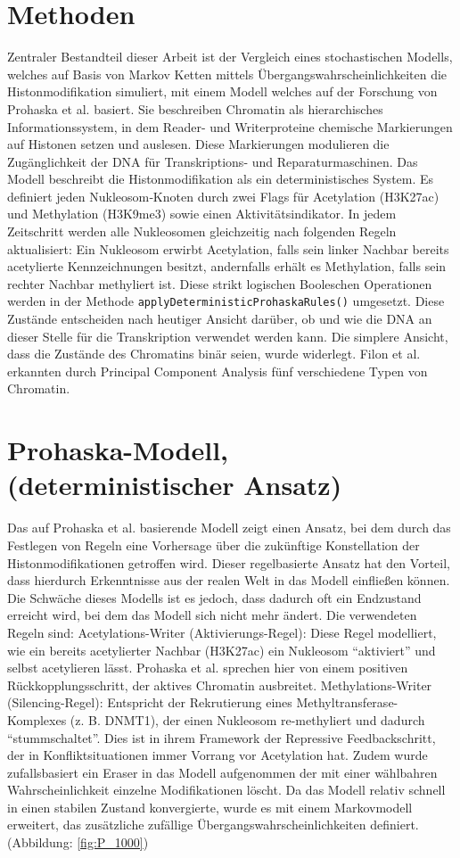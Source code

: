 \documentclass{SeminarV2}
\begin{document}
\section{Methoden}
Zentraler Bestandteil dieser Arbeit ist der Vergleich eines stochastischen Modells, welches auf Basis von Markov Ketten mittels \"{U}bergangswahrscheinlichkeiten die Histonmodifikation simuliert, mit einem Modell welches auf der Forschung von
Prohaska et al. basiert.
Sie beschreiben Chromatin als hierarchisches Informationssystem, in dem Reader- und Writerproteine chemische Markierungen auf Histonen setzen und auslesen. 
Diese Markierungen modulieren die Zugänglichkeit der DNA für Transkriptions- und Reparaturmaschinen.
Das Modell beschreibt die Histonmodifikation als ein deterministisches System.
Es definiert jeden Nukleosom‑Knoten durch zwei Flags für Acetylation (H3K27ac) und Methylation (H3K9me3) sowie einen Aktivitätsindikator. In jedem Zeitschritt werden alle Nukleosomen gleichzeitig nach folgenden Regeln aktualisiert: 
Ein Nukleosom erwirbt Acetylation, falls sein linker Nachbar bereits acetylierte Kennzeichnungen besitzt, andernfalls erhält es Methylation, falls sein rechter Nachbar methy­liert ist. Diese strikt logischen Booleschen Operationen werden in der Methode \texttt{applyDeterministicProhaskaRules()} umgesetzt.
Diese Zustände entscheiden nach heutiger Ansicht darüber, ob und wie die DNA an dieser Stelle für die Transkription verwendet werden kann.
Die simplere Ansicht, dass die Zustände des Chromatins binär seien, wurde widerlegt. Filon et al. erkannten durch Principal Component Analysis fünf verschiedene 
Typen von Chromatin. \cite{filon-2010}

\section{Prohaska-Modell, (deterministischer Ansatz)}
Das auf Prohaska et al. basierende Modell zeigt einen Ansatz, bei dem durch das Festlegen
von Regeln eine Vorhersage über die zukünftige Konstellation der Histonmodifikationen getroffen wird.
Dieser regelbasierte Ansatz hat den Vorteil, dass hierdurch Erkenntnisse aus der realen Welt in das Modell einfließen können.
Die Schwäche dieses Modells ist es jedoch, dass dadurch oft ein Endzustand erreicht wird, bei dem das Modell sich nicht mehr ändert.
Die verwendeten Regeln sind:
Acetylations-Writer (Aktivierungs-Regel):
Diese Regel modelliert, wie ein bereits acetylierter Nachbar (H3K27ac) ein Nukleosom “aktiviert” und selbst acetylieren lässt. Prohaska et al. sprechen hier von einem positiven Rückkopplungsschritt, der aktives Chromatin ausbreitet.
Methylations-Writer (Silencing-Regel):
Entspricht der Rekrutierung eines Methyltransferase-Komplexes (z. B. DNMT1), der einen Nukleosom re-methyliert und dadurch “stummschaltet”. Dies ist in ihrem Framework der Repressive Feedbackschritt, der in Konfliktsituationen immer Vorrang vor Acetylation hat.
Zudem wurde zufallsbasiert ein Eraser in das Modell aufgenommen der mit einer wählbahren Wahrscheinlichkeit einzelne Modifikationen löscht.
Da das Modell relativ schnell in einen stabilen Zustand konvergierte, wurde es mit einem Markovmodell erweitert, das zusätzliche zufällige Übergangswahrscheinlichkeiten definiert. (Abbildung: \ref{fig:P_1000})
\end{document}
